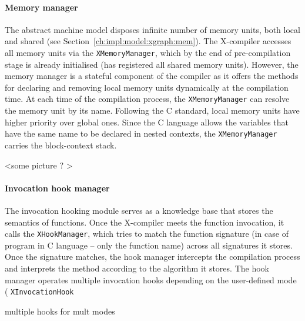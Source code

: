 

\paragraph{Memory manager}
\label{ch:impl:proc:x-compiler:mem}

The \xgraph{} abstract machine model disposes infinite number of memory units, both local and shared (see Section~\ref{ch:impl:model:xgraph:mem}).
The X-compiler accesses all memory units via the \texttt{XMemoryManager}, which by the end of pre-compilation stage is already initialised (has registered all shared memory units).
However, the memory manager is a stateful component of the compiler as it offers the methods for declaring and removing local memory units dynamically at the compilation time.
At each time of the compilation process, the \texttt{XMemoryManager} can resolve the memory unit by its name.
Following the C standard, local memory units have higher priority over global ones.
Since the C language allows the variables that have the same name to be declared in nested contexts, the \texttt{XMemoryManager} carries the block-context stack. %

<some picture ? >

\paragraph{Invocation hook manager}
\label{ch:impl:proc:x-compiler:hooking}

The invocation hooking module serves as a knowledge base that stores the semantics of functions.
Once the X-compiler meets the function invocation, it calls the \texttt{XHookManager}, which tries to match the function signature (in case of program in C language -- only the function name) across all signatures it stores.
Once the signature matches, the hook manager intercepts the compilation process and interprets the method according to the algorithm it stores.
The hook manager operates multiple invocation hooks depending on the user-defined mode (
 \texttt{XInvocationHook} 

multiple hooks for mult modes

